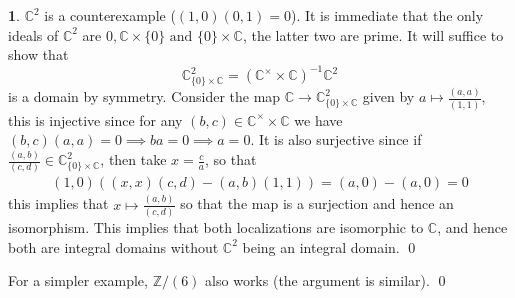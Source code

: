 \documentclass[11pt]{article}
\theoremstyle{definition}
\newtheorem{pb}{}
\newcommand{\set}[1]{\{#1\}}
\newcommand{\tand}{\text{ and }}
\begin{document}
\begin{pb}
        \(\mathbb{C}^2\) is a counterexample (\((1,0)(0,1) = 0\)). It is immediate that the only ideals of \(\mathbb{C}^2\) are \(0, \mathbb{C} \times \set{0} \tand \set{0} \times \mathbb{C}\), the latter two are prime. It will suffice to show that \[\mathbb{C}^2_{\set{0} \times \mathbb{C}} = (\mathbb{C}^\times \times \mathbb{C})^{-1}\mathbb{C}^2\] is a domain by symmetry. Consider the map \(\mathbb{C} \to \mathbb{C}^2_{\set{0} \times \mathbb{C}}\) given by \(a \mapsto \frac{(a,a)}{(1,1)}\), this is injective since for any \((b,c) \in \mathbb{C}^\times \times \mathbb{C}\) we have \((b,c)(a,a) = 0 \implies ba = 0 \implies a = 0\).
        It is also surjective since if \(\frac{(a,b)}{(c,d)} \in \mathbb{C}^2_{\set{0} \times \mathbb{C}}\), then take \(x = \frac{c}{a}\), so that
        \begin{align*}
            (1,0)((x,x)(c,d) - (a,b)(1,1)) = (a,0) - (a,0) = 0
        \end{align*}
        this implies that \(x \mapsto \frac{(a,b)}{(c,d)}\) so that the map is a surjection and hence an isomorphism. This implies that both localizations are isomorphic to \(\mathbb{C}\), and hence both are integral domains without \(\mathbb{C}^2\) being an integral domain. \qed

        For a simpler example, \(\mathbb{Z}/(6)\) also works (the argument is similar). \qed
    \end{pb}
\end{document}
